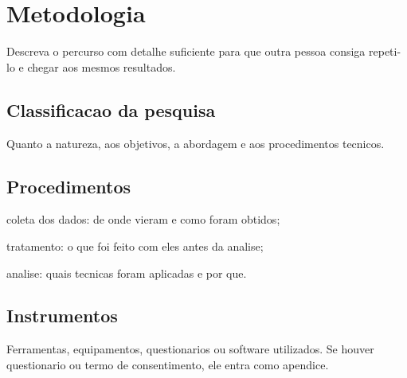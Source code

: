 \chapter{Metodologia}
\label{cap:metodologia}

Descreva o percurso com detalhe suficiente para que outra pessoa consiga
repeti-lo e chegar aos mesmos resultados.

\section{Classificacao da pesquisa}
\label{sec:classificacao}

Quanto a natureza, aos objetivos, a abordagem e aos procedimentos tecnicos.

\section{Procedimentos}
\label{sec:procedimentos}

\begin{alineas}
  \item coleta dos dados: de onde vieram e como foram obtidos;
  \item tratamento: o que foi feito com eles antes da analise;
  \item analise: quais tecnicas foram aplicadas e por que.
\end{alineas}

\section{Instrumentos}
\label{sec:instrumentos}

Ferramentas, equipamentos, questionarios ou software utilizados. Se houver
questionario ou termo de consentimento, ele entra como apendice.

%
